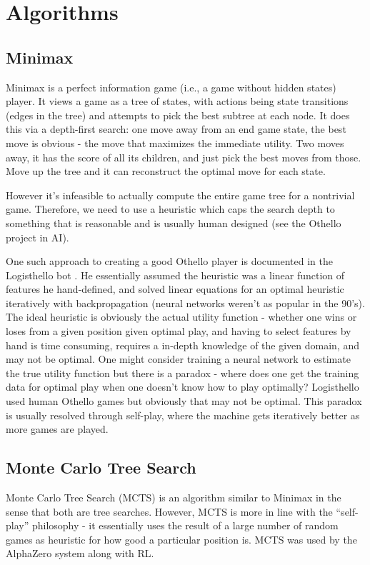 \documentclass[11pt, oneside]{article}
\begin{document}
\section{Algorithms}
\subsection{Minimax}

Minimax is a perfect information game (i.e., a game without hidden states) player.
It views a game as a tree of states, with actions being state transitions (edges in the tree)
and attempts to pick the best subtree at each node.
It does this via a depth-first search: one move away from an end game state,
the best move is obvious - the move that maximizes the immediate utility.
Two moves away, it has the score of all its children, and just pick the best moves from those.
Move up the tree and it can reconstruct the optimal move for each state.

However it's infeasible to actually compute the entire game tree for a nontrivial game.
Therefore, we need to use a heuristic which caps the search depth to something
that is reasonable and is usually human designed (see the Othello project in AI).

One such approach to creating a good Othello player is documented in the Logisthello
bot \cite{Buro97experimentswith}. He essentially assumed the heuristic
was a linear function of features he hand-defined, and solved linear equations
for an optimal heuristic iteratively with backpropagation
(neural networks weren't as popular in the 90's).
The ideal heuristic is obviously the actual utility function - whether one wins or
loses from a given position given optimal play, and having to select features
by hand is time consuming, requires a in-depth knowledge of the given domain,
and may not be optimal. One might consider training a neural network to estimate
the true utility function but there is a paradox -
where does one get the training data for optimal play when one doesn't know
how to play optimally? Logisthello used human Othello games but obviously
that may not be optimal. This paradox is usually resolved through self-play,
where the machine gets iteratively better as more games are played.

\subsection{Monte Carlo Tree Search}

Monte Carlo Tree Search (MCTS) is an algorithm similar to Minimax in the sense
that both are tree searches. However, MCTS is more in line with the ``self-play''
philosophy - it essentially uses the result of a large number of random games
as heuristic for how good a particular position is.
MCTS was used by the AlphaZero system along with RL.
\end{document}
